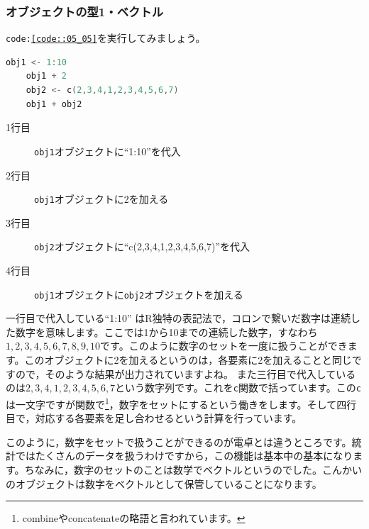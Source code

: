 \documentclass{ltjbook}
\begin{document}
\subsubsection{オブジェクトの型1・ベクトル}
\texttt{code:\ref{code::05_05}}を実行してみましょう。
\begin{lstlisting}[language=c++,label={code::05_05},caption={ベクトル処理}]
	obj1 <- 1:10
	obj1 + 2
	obj2 <- c(2,3,4,1,2,3,4,5,6,7)
	obj1 + obj2
\end{lstlisting}

\begin{description}
    \item[1行目] \texttt{obj1}オブジェクトに``1:10''を代入
	\item[2行目] \texttt{obj1}オブジェクトに2を加える 
	\item[3行目] \texttt{obj2}オブジェクトに``c(2,3,4,1,2,3,4,5,6,7)''を代入
	\item[4行目] \texttt{obj1}オブジェクトに\texttt{obj2}オブジェクトを加える
\end{description}

一行目で代入している``1:10'' はR独特の表記法で，コロンで繋いだ数字は連続した数字を意味します。ここでは1から10までの連続した数字，すなわち$1,2,3,4,5,6,7,8,9,10$です。このように数字のセットを一度に扱うことができます。このオブジェクトに2を加えるというのは，各要素に2を加えることと同じですので，そのような結果が出力されていますよね。
また三行目で代入しているのは$2,3,4,1,2,3,4,5,6,7$という数字列です。これを\texttt{c}関数で括っています。この\texttt{c}は一文字ですが関数で\footnote{combineやconcatenateの略語と言われています。}，数字をセットにするという働きをします。そして四行目で，対応する各要素を足し合わせるという計算を行っています。

このように，数字をセットで扱うことができるのが電卓とは違うところです。統計ではたくさんのデータを扱うわけですから，この機能は基本中の基本になります。ちなみに，数字のセットのことは数学でベクトルというのでした。こんかいのオブジェクトは数字をベクトルとして保管していることになります。
\end{document}
